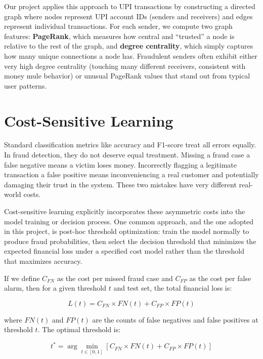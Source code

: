 Our project applies this approach to UPI transactions by constructing a directed graph where nodes represent UPI account IDs (senders and receivers) and edges represent individual transactions. For each sender, we compute two graph features: \textbf{PageRank}, which measures how central and ``trusted'' a node is relative to the rest of the graph, and \textbf{degree centrality}, which simply captures how many unique connections a node has. Fraudulent senders often exhibit either very high degree centrality (touching many different receivers, consistent with money mule behavior) or unusual PageRank values that stand out from typical user patterns.

\section{Cost-Sensitive Learning}

Standard classification metrics like accuracy and F1-score treat all errors equally. In fraud detection, they do not deserve equal treatment. Missing a fraud case a false negative means a victim loses money. Incorrectly flagging a legitimate transaction a false positive means inconveniencing a real customer and potentially damaging their trust in the system. These two mistakes have very different real-world costs.

Cost-sensitive learning explicitly incorporates these asymmetric costs into the model training or decision process. One common approach, and the one adopted in this project, is post-hoc threshold optimization: train the model normally to produce fraud probabilities, then select the decision threshold that minimizes the expected financial loss under a specified cost model rather than the threshold that maximizes accuracy.

If we define $C_{FN}$ as the cost per missed fraud case and $C_{FP}$ as the cost per false alarm, then for a given threshold $t$ and test set, the total financial loss is:

\begin{equation}
L(t) = C_{FN} \times FN(t) + C_{FP} \times FP(t)
\end{equation}

where $FN(t)$ and $FP(t)$ are the counts of false negatives and false positives at threshold $t$. The optimal threshold is:

\begin{equation}
t^* = \arg\min_{t \in [0,1]} \left[ C_{FN} \times FN(t) + C_{FP} \times FP(t) \right]
\end{equation}

